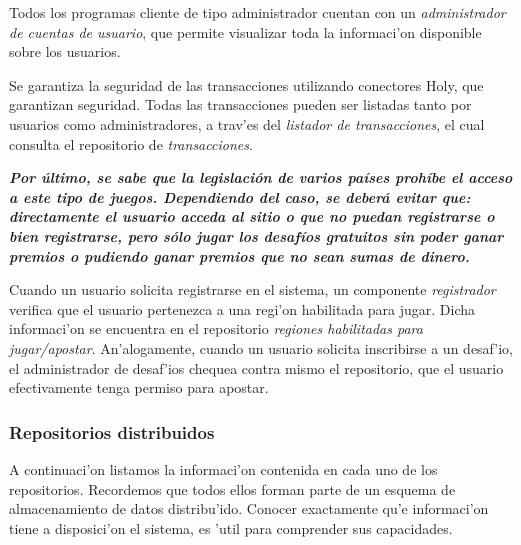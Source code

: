 Todos los programas cliente de tipo administrador cuentan con un \textit{administrador de cuentas de usuario}, que permite visualizar toda la informaci'on disponible sobre los usuarios.

Se garantiza la seguridad de las transacciones utilizando conectores Holy, que garantizan seguridad. Todas las transacciones pueden ser listadas tanto por usuarios como administradores, a trav'es del \textit{listador de transacciones}, el cual consulta el repositorio de \textit{transacciones}.

\textbf{\textit{Por último, se sabe que la legislación de varios países prohíbe el acceso a este tipo de juegos. Dependiendo del caso, se deberá evitar que: directamente el usuario acceda al sitio o que no puedan registrarse o bien registrarse, pero sólo jugar los desafíos gratuitos sin poder ganar premios o pudiendo ganar premios que no sean sumas de dinero.}}

Cuando un usuario solicita registrarse en el sistema, un componente \textit{registrador} verifica que el usuario pertenezca a una regi'on habilitada para jugar. Dicha informaci'on se encuentra en el repositorio \textit{regiones habilitadas para jugar/apostar}. An'alogamente, cuando un usuario solicita inscribirse a un desaf'io, el administrador de desaf'ios chequea contra mismo el repositorio, que el usuario efectivamente tenga permiso para apostar.

\subsubsection{Repositorios distribuidos}

A continuaci'on listamos la informaci'on contenida en cada uno de los repositorios. Recordemos que todos ellos forman parte de un esquema de almacenamiento de datos distribu'ido. Conocer exactamente qu'e informaci'on tiene a disposici'on el sistema, es 'util para comprender sus capacidades.

